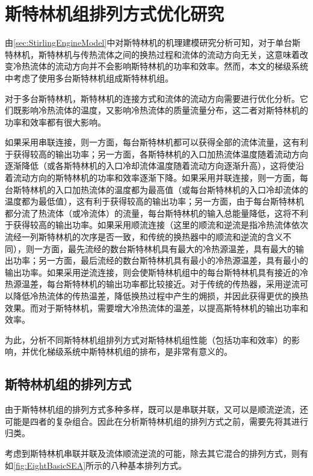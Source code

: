 \chapter{斯特林机组排列方式优化研究}
\label{cha:optSEA}

由\autoref{sec:StirlingEngineModel}中对斯特林机的机理建模研究分析可知，对于单台斯特林机，斯特林机与传热流体之间的换热过程和流体的流动方向无关，这意味着改变冷热流体的流动方向并不会影响斯特林机的功率和效率。然而，本文的梯级系统中考虑了使用多台斯特林机组成斯特林机组。

对于多台斯特林机，斯特林机的连接方式和流体的流动方向需要进行优化分析。它们既影响冷热流体的温度，又影响冷热流体的质量流量分布，这二者对斯特林机的功率和效率都有很大影响。


如果采用串联连接，则一方面，每台斯特林机都可以获得全部的流体流量，这有利于获得较高的输出功率；另一方面，各斯特林机的入口加热流体温度随着流动方向逐渐降低（或各斯特林机的入口冷却流体温度随着流动方向逐渐升高），这将使沿着流动方向的斯特林机的功率和效率逐渐下降。如果采用并联连接，则一方面，每台斯特林机的入口加热流体的温度都为最高值（或每台斯特林机的入口冷却流体的温度都为最低值），这有利于获得较高的输出功率；另一方面，由于每台斯特林机都分流了热流体（或冷流体）的流量，每台斯特林机的输入总能量降低，这将不利于获得较高的输出功率。如果采用顺流连接（这里的顺流和逆流是指冷热流体依次流经一列斯特林机的次序是否一致，和传统的换热器中的顺流和逆流的含义不同），则一方面，最先流经的数台斯特林机具有最大的冷热源温差，具有最大的输出功率；另一方面，最后流经的数台斯特林机具有最小的冷热源温差，具有最小的输出功率。如果采用逆流连接，则会使斯特林机组中的每台斯特林机具有接近的冷热源温差，每台斯特林机的输出功率都比较接近。对于传统的传热器，采用逆流可以降低冷热流体的传热温差，降低换热过程中产生的㶲损，并因此获得更优的换热效果。而对于斯特林机，需要增大冷热流体的温差，以提高斯特林机的输出功率和效率。


为此，分析不同斯特林机组排列方式对斯特林机组性能（包括功率和效率）的影响，并优化梯级系统中斯特林机组的排布，是非常有意义的。

\section{斯特林机组的排列方式}
\label{sec:connectionTypes}
由于斯特林机组的排列方式多种多样，既可以是串联并联，又可以是顺流逆流，还可能是四者的复杂组合。因此在分析斯特林机组的排列方式之前，需要先将其进行归类。

考虑到斯特林机串联并联及流体顺流逆流的可能，除去其它混合的排列方式，则有如\autoref{fig:EightBasicSEA}所示的八种基本排列方式。


